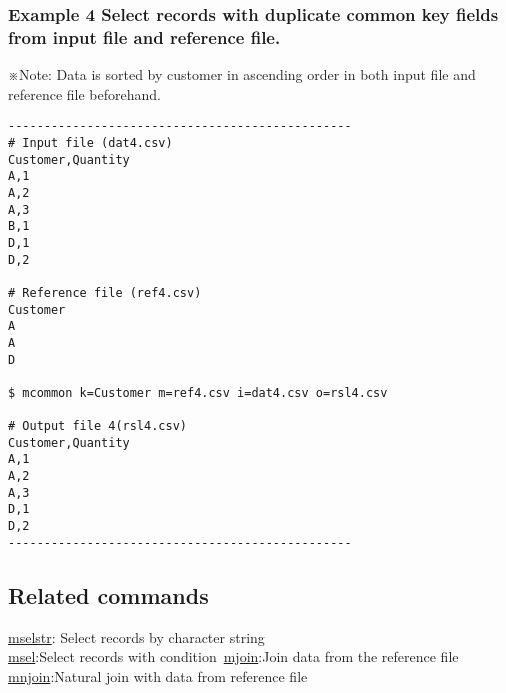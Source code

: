 \documentclass[a4paper]{jarticle}
\begin{document}
\subsubsection*{Example 4 Select records with duplicate common key fields from input file and reference file.  }
\noindent
※Note: Data is sorted by customer in ascending order in both input file and reference file beforehand. 

\begin{verbatim}
------------------------------------------------
# Input file (dat4.csv)
Customer,Quantity 
A,1
A,2
A,3
B,1
D,1
D,2

# Reference file (ref4.csv)
Customer
A
A
D

$ mcommon k=Customer m=ref4.csv i=dat4.csv o=rsl4.csv

# Output file 4(rsl4.csv)
Customer,Quantity
A,1
A,2
A,3
D,1
D,2
------------------------------------------------
\end{verbatim}


\subsection*{Related commands}
\noindent
\href{run:mselstr.pdf}{mselstr}: Select records by character string\\
\href{run:msel.pdf}{msel}:Select records with condition\
\href{run:mjoin.pdf}{mjoin}:Join data from the reference file \\
\href{run:mnjoin.pdf}{mnjoin}:Natural join with data from reference file \\
\end{document}
